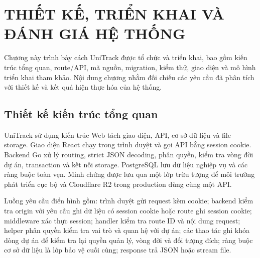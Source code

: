 \chapter{THIẾT KẾ, TRIỂN KHAI VÀ ĐÁNH GIÁ HỆ THỐNG}

Chương này trình bày cách UniTrack được tổ chức và triển khai, bao gồm kiến trúc tổng quan, route/API, mã nguồn, migration, kiểm thử, giao diện và mô hình triển khai tham khảo. Nội dung chương nhằm đối chiếu các yêu cầu đã phân tích với thiết kế và kết quả hiện thực hóa của hệ thống.

\section{Thiết kế kiến trúc tổng quan}

UniTrack sử dụng kiến trúc Web tách giao diện, API, cơ sở dữ liệu và file storage. Giao diện React chạy trong trình duyệt và gọi API bằng session cookie. Backend Go xử lý routing, strict JSON decoding, phân quyền, kiểm tra vòng đời dự án, transaction và kết nối storage. PostgreSQL lưu dữ liệu nghiệp vụ và các ràng buộc toàn vẹn. Minh chứng được lưu qua một lớp trừu tượng để môi trường phát triển cục bộ và Cloudflare R2 trong production dùng cùng một API.

\figSystemContext

Luồng yêu cầu điển hình gồm: trình duyệt gửi request kèm cookie; backend kiểm tra origin với yêu cầu ghi dữ liệu có session cookie hoặc route ghi session cookie; middleware xác thực session; handler kiểm tra route ID và nội dung request; helper phân quyền kiểm tra vai trò và quan hệ với dự án; các thao tác ghi khóa dòng dự án để kiểm tra lại quyền quản lý, vòng đời và đối tượng đích; ràng buộc cơ sở dữ liệu là lớp bảo vệ cuối cùng; response trả JSON hoặc stream file.

\figRequestBoundary

